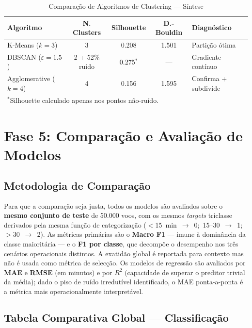 \documentclass[conference]{IEEEtran}
\begin{document}
\begin{table}[h]
\centering
\caption{Comparação de Algoritmos de Clustering — Síntese}
\label{tab:cluster_comparison}
\setlength{\tabcolsep}{3pt}
\begin{tabular}{lcccl}
\toprule
\textbf{Algoritmo} & \textbf{N. Clusters} & \textbf{Silhouette} & \textbf{D.-Bouldin} & \textbf{Diagnóstico} \\
\midrule
K-Means ($k=3$) & 3 & 0.208 & 1.501 & Partição ótima \\
DBSCAN ($\varepsilon=1.5$) & 2 + 52\% ruído & 0.275$^*$ & — & Gradiente contínuo \\
Agglomerative ($k=4$) & 4 & 0.156 & 1.595 & Confirma + subdivide \\
\bottomrule
\multicolumn{5}{l}{$^*$Silhouette calculado apenas nos pontos não-ruído.} \\
\end{tabular}
\end{table}

\section{Fase 5: Comparação e Avaliação de Modelos}

\subsection{Metodologia de Comparação}
Para que a comparação seja justa, todos os modelos são avaliados sobre o
\textbf{mesmo conjunto de teste} de 50.000 voos, com os mesmos \textit{targets}
triclasse derivados pela mesma função de categorização
($<$15~min~$\to$~0;~15–30~$\to$~1;~$>$30~$\to$~2). As métricas primárias
são o \textbf{Macro F1} — imune à dominância da classe maioritária — e o
\textbf{F1 por classe}, que decompõe o desempenho nos três cenários operacionais
distintos. A exatidão global é reportada para contexto mas não é usada como
métrica de selecção. Os modelos de regressão são avaliados por \textbf{MAE} e
\textbf{RMSE} (em minutos) e por $R^2$ (capacidade de superar o preditor trivial
da média); dado o piso de ruído irredutível identificado, o MAE ponta-a-ponta é
a métrica mais operacionalmente interpretável.

\subsection{Tabela Comparativa Global — Classificação}
\end{document}
